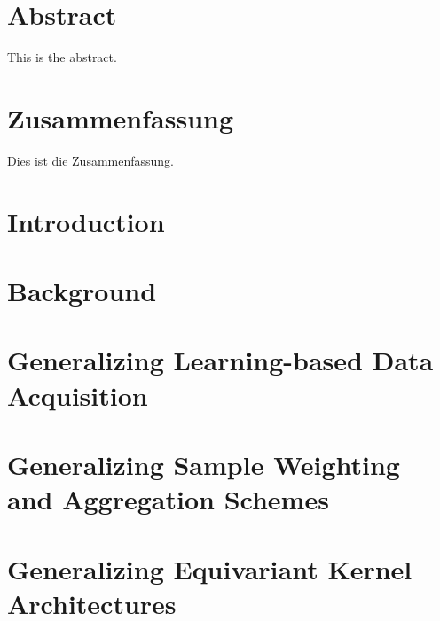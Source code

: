 \documentclass[11pt, a4paper, oneside, headsepline, titlepage, DIV=11, BCOR=12mm, captions=tableheading, chapterprefix=on, numbers=noenddot]{scrbook}
\begin{document}
    \thispagestyle{headings}
    

    \enlargethispage{1\baselineskip}
    \setcounter{page}{1}

    \chapter*{Abstract} %
        This is the abstract.
    \cleardoublepage

    \chapter*{Zusammenfassung} %
        Dies ist die Zusammenfassung.
    \cleardoublepage

    \tableofcontents
    \cleardoublepage

    \chapter{Introduction} %
        \label{chap:introduction}
        

    \chapter{Background} %
        \label{chap:background}
        

    \chapter{Generalizing Learning-based Data Acquisition}
        \label{chap:acquisitionfocus}

    \chapter{Generalizing Sample Weighting and Aggregation Schemes}
        \label{chap:deepstaple}

    \chapter{Generalizing Equivariant Kernel Architectures}
        \label{chap:xedgeconv}
\end{document}
